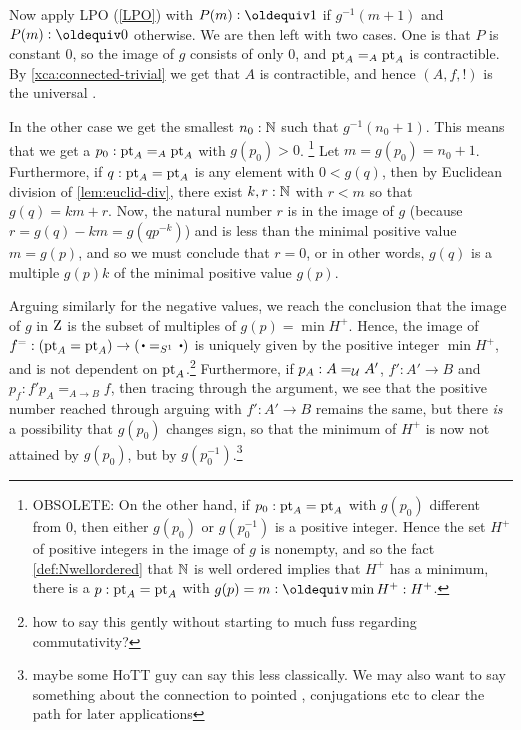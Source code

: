 Now apply LPO (\cref{LPO}) with $P(m)\defeq 1$ if $g^{-1}(m+1)$ and $P(m)\defeq 0$ otherwise.
We are then left with two cases.
One is that $P$ is constant $0$, so the image of $g$ consists of only $0$, 
and ${\mathord{\mathrm{pt}}}_A=_A{\mathord{\mathrm{pt}}}_A$ is contractible. By \cref{xca:connected-trivial}
we get that $A$ is contractible, and hence $(A,f,!)$ is the universal \covering.

In the other case we get the smallest $n_0: \mathbb{N}$ such that $g^{-1}(n_0 + 1)$.
This means that we get a $p_0:{\mathord{\mathrm{pt}}}_A=_A{\mathord{\mathrm{pt}}}_A$ with $g(p_0)>0$. 
\footnote{OBSOLETE: On the other hand, if $p_0:{\mathord{\mathrm{pt}}}_A={\mathord{\mathrm{pt}}}_A$ with $g(p_0)$ different from $0$, then either $g(p_0)$ or $g(p_0^{-1})$ is a positive integer.  Hence the set $H^+$ of positive integers in the image of $g$ is nonempty, and so the fact \cref{def:Nwellordered} that $\mathbb{N}$ is well ordered implies that $H^+$ has a minimum, \ie there is a $p:{\mathord{\mathrm{pt}}}_A={\mathord{\mathrm{pt}}}_A$ with  $g(p)=m\defequi\min H^+:H^+$.}
Let $m=g(p_0)=n_0 +1$.
Furthermore, if $q:{\mathord{\mathrm{pt}}}_A={\mathord{\mathrm{pt}}}_A$ is any element with $0<g(q)$, then  by Euclidean division of \cref{lem:euclid-div}, there exist $k,r:\mathbb{N}$ with $r<m$ so that $g(q)=km+r$.  Now, the natural number $r$ is in the image of $g$ (because $r=g(q)-km=g(qp^{-k})$) and is less than the minimal positive value $m=g(p)$, and so we must conclude that $r=0$, or in other words, $g(q)$ is a multiple $g(p)k$ of the minimal positive value $g(p)$.


Arguing similarly for the negative values, we reach the conclusion that the image of $g$ in $\mathrm{Z}$ is the subset of multiples of $g(p)=\min H^+$.  Hence, the image of $f^=:(\pt_A=\pt_A)\to(\base=_{\Sc}\base)$ is uniquely given by the positive integer $\min H^+$, and is not dependent on ${\mathord{\mathrm{pt}}}_A$.\footnote{how to say this gently without starting to much fuss regarding commutativity?}  Furthermore, if $p_A:A=_{\mathcal{U}}A'$, $f':A'\to B$ and $p_f:f'p_A=_{A\to B}f$, then tracing through the argument, we see that the positive number reached through arguing with $f':A'\to B$ remains the same, but there \emph{is} a possibility that $g(p_0)$ changes sign, so that the minimum of $H^+$ is now not attained by $g(p_0)$, but by $g(p_0^{-1})$.\footnote{maybe some HoTT guy can say this less classically.  We may also want to say something about the connection to pointed \coverings, conjugations etc to clear the path for later applications}

